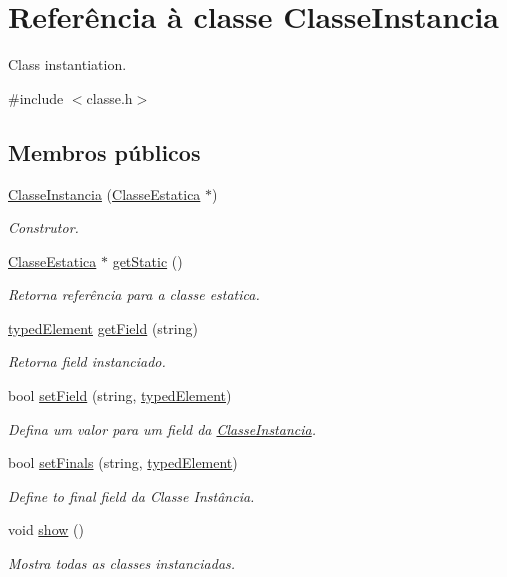 \hypertarget{classClasseInstancia}{}\section{Referência à classe Classe\+Instancia}
\label{classClasseInstancia}


Class instantiation.  




{\ttfamily \#include $<$classe.\+h$>$}

\subsection*{Membros públicos}
\begin{DoxyCompactItemize}
\item 
\hyperlink{classClasseInstancia_a312ab86623aeb82cef61d34a9b8ec73c}{Classe\+Instancia} (\hyperlink{classClasseEstatica}{Classe\+Estatica} $\ast$)
\begin{DoxyCompactList}\small\item\em Construtor. \end{DoxyCompactList}\item 
\hyperlink{classClasseEstatica}{Classe\+Estatica} $\ast$ \hyperlink{classClasseInstancia_afd5b88bd863678ab6744641ed96a1107}{get\+Static} ()
\begin{DoxyCompactList}\small\item\em Retorna referência para a classe estatica. \end{DoxyCompactList}\item 
\hyperlink{structtypedElement__s}{typed\+Element} \hyperlink{classClasseInstancia_ac7a68540fbd5c6f17b0f77a21fc37bf7}{get\+Field} (string)
\begin{DoxyCompactList}\small\item\em Retorna field instanciado. \end{DoxyCompactList}\item 
bool \hyperlink{classClasseInstancia_a468e473bc4fc726d72d0824ca92d5504}{set\+Field} (string, \hyperlink{structtypedElement__s}{typed\+Element})
\begin{DoxyCompactList}\small\item\em Defina um valor para um field da \hyperlink{classClasseInstancia}{Classe\+Instancia}. \end{DoxyCompactList}\item 
bool \hyperlink{classClasseInstancia_ae315a47206bcc946ad7accb8cd09ab44}{set\+Finals} (string, \hyperlink{structtypedElement__s}{typed\+Element})
\begin{DoxyCompactList}\small\item\em Define to final field da Classe Instância. \end{DoxyCompactList}\item 
void \hyperlink{classClasseInstancia_abcc9bebdd4ac09f7b77969ee4a16f2d6}{show} ()
\begin{DoxyCompactList}\small\item\em Mostra todas as classes instanciadas. \end{DoxyCompactList}\end{DoxyCompactItemize}


